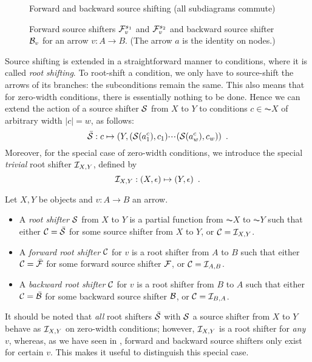 \begin{figure}
\centering

\caption{Forward and backward source shifting (all subdiagrams commute)}
\end{figure}

\begin{figure}
\centering

\caption{Forward source shifters $\mathcal{F}_v^{s_1}$ and $\mathcal{F}_v^{s_2}$ and backward source shifter $\mathcal{B}_v$ for an arrow $v:A\to B$. (The arrow $a$ is the identity on nodes.)}
\end{figure}

Source shifting is extended in a straightforward manner to conditions, where it is called \emph{root shifting}. To root-shift a condition, we only have to source-shift the arrows of its branches: the subconditions remain the same. This also means that for zero-width conditions, there is essentially nothing to be done. Hence we can extend the action of a source shifter $\mathcal{S}$ from $X$ to $Y$ to conditions $c\in \AC X$ of arbitrary width $|c|=w$, as follows:
\[ \bar{\mathcal{S}}: c\mapsto (Y,(\mathcal{S}(a^c_1),c_1){\cdotp\mkern-2mu\cdotp\mkern-2mu\cdotp\mkern1mu} (\mathcal{S}(a^c_w),c_w)) \enspace. \]
Moreover, for the special case of zero-width conditions, we introduce the special \emph{trivial} root shifter $\mathcal{I}_{X,Y}$, defined by
\[ \mathcal{I}_{X,Y}: (X,\epsilon) \mapsto (Y,\epsilon) \enspace. \]

\begin{definition}
Let $X,Y$ be objects and $v:A\to B$ an arrow.
\begin{itemize}[topsep=\smallskipamount]
\item A \emph{root shifter} $\mathcal{S}$ from $X$ to $Y$ is a partial function from $\AC X$ to $\AC Y$ such that either $\mathcal{C}=\bar{\mathcal{S}}$ for some source shifter from $X$ to $Y$, or $\mathcal{C}=\mathcal{I}_{X,Y}$.

\item A \emph{forward root shifter} $\mathcal{C}$ for $v$ is a root shifter from $A$ to $B$ such that either $\mathcal{C}=\bar{\mathcal{F}}$ for some forward source shifter $\mathcal{F}$, or $\mathcal{C}=\mathcal{I}_{A,B}$.

\item A \emph{backward root shifter} $\mathcal{C}$ for $v$ is a root shifter from $B$ to $A$ such that either $\mathcal{C}=\bar{\mathcal{B}}$ for some backward source shifter $\mathcal{B}$, or $\mathcal{C}=\mathcal{I}_{B,A}$.
\end{itemize}
\end{definition}
%
It should be noted that \emph{all} root shifters $\bar{\mathcal{S}}$ with $\mathcal{S}$ a source shifter from $X$ to $Y$ behave as $\mathcal{I}_{X,Y}$ on zero-width conditions; however, $\mathcal{I}_{X,Y}$ is a root shifter for \emph{any} $v$, whereas, as we have seen in , forward and backward source shifters only exist for certain $v$. This makes it useful to distinguish this special case.


